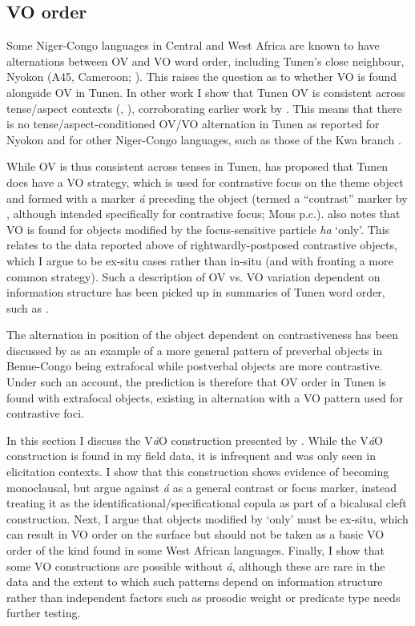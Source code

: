 \documentclass[output=paper,colorlinks,citecolor=brown
]{langscibook}
\begin{document}
\subsection{VO order}
Some Niger-Congo languages in Central and West Africa are known to have alternations between OV and VO word order, including Tunen's close neighbour, Nyokon (A45, Cameroon; \citealt{Mous2005}). This raises the question as to whether VO is found alongside OV in Tunen. In other work I show that Tunen OV is consistent across tense/aspect contexts (\citealt{Kerr2024}, \citeyear[Chapter 6]{KerrFut}), corroborating earlier work by \citet{Mous1997, Mous2005}. This means that there is no tense/aspect-conditioned OV/VO alternation in Tunen as reported for Nyokon and for other Niger-Congo languages, such as those of the Kwa branch \citep{Heine1976, Creissels2005, Creissels2018, SandeEtAl2019}.

While OV is thus consistent across tenses in Tunen, \citet{Mous1997, Mous2003} has proposed that Tunen does have a VO strategy, which is used for contrastive focus on the theme object and formed with a marker \textit{á} preceding the object (termed a ``contrast'' marker by \citealt{Mous2003}, although intended specifically for contrastive focus; Mous p.c.). \citet{Mous1997} also notes that VO is found for objects modified by the focus-sensitive particle \textit{ha} `only'. This relates to the data reported above of rightwardly-postposed contrastive objects, which I argue to be ex-situ cases rather than in-situ (and with fronting a more common strategy). Such a description of OV vs. VO variation dependent on information structure has been picked up in summaries of Tunen word order, such as \citet[273--274]{DowningMarten2019}.

The alternation in position of the object dependent on contrastiveness has been discussed by \citet{Güldemann2007} as an example of a more general pattern of preverbal objects in Benue-Congo being extrafocal while postverbal objects are more contrastive. Under such an account, the prediction is therefore that OV order in Tunen is found with extrafocal objects, existing in alternation with a VO pattern used for contrastive foci.

In this section I discuss the V\textit{á}O construction presented by \citet{Mous1997}. While the V\textit{á}O construction is found in my field data, it is infrequent and was only seen in elicitation contexts. I show that this construction shows evidence of becoming monoclausal, but argue against \textit{á} as a general contrast or focus marker, instead treating it as the identificational/specificational copula as part of a bicalusal cleft construction. Next, I argue that objects modified by `only' must be ex-situ, which can result in VO order on the surface but should not be taken as a basic VO order of the kind found in some West African languages. Finally, I show that some VO constructions are possible without \textit{á}, although these are rare in the data and the extent to which such patterns depend on information structure rather than independent factors such as prosodic weight or predicate type needs further testing.
\end{document}
